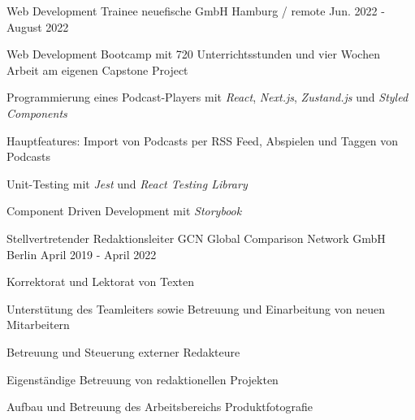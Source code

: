 

\begin{cventries}

  \cventry
    {Web Development Trainee} %
    {neuefische GmbH} %
    {Hamburg / remote} %
    {Jun. 2022 - August 2022} %
    {
      \begin{cvitems} %
        \item {Web Development Bootcamp mit 720 Unterrichtsstunden und vier Wochen Arbeit am eigenen Capstone Project}
        \item {Programmierung eines Podcast-Players mit \emph{React}, \emph{Next.js}, \emph{Zustand.js} und \emph{Styled Components}}
        \item {Hauptfeatures: Import von Podcasts per RSS Feed, Abspielen und Taggen von Podcasts}
        \item {Unit-Testing mit \emph{Jest} und \emph{React Testing Library}}
        \item {Component Driven Development mit \emph{Storybook}}
      \end{cvitems}
    }

  \cventry
    {Stellvertretender Redaktionsleiter} %
    {GCN Global Comparison Network GmbH} %
    {Berlin} %
    {April 2019 - April 2022} %
    {
      \begin{cvitems} %
        \item {Korrektorat und Lektorat von Texten}
        \item {Unterstütung des Teamleiters sowie Betreuung und Einarbeitung von neuen Mitarbeitern}
        \item {Betreuung und Steuerung externer Redakteure}
        \item {Eigenständige Betreuung von redaktionellen Projekten}
        \item {Aufbau und Betreuung des Arbeitsbereichs Produktfotografie}
      \end{cvitems}
    }


\end{cventries}
